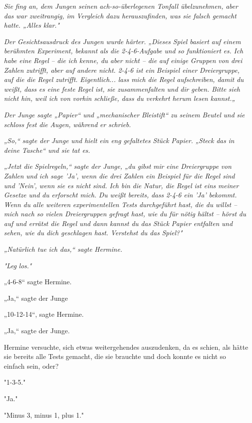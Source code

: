 {\emph{Sie fing an, dem Jungen seinen ach-so-überlegenen Tonfall übelzunehmen, aber das war zweitrangig, im Vergleich dazu herauszufinden, was sie falsch gemacht hatte. „Alles klar."}

\emph{Der Gesichtsausdruck des Jungen wurde härter. „Dieses Spiel basiert auf einem berühmten Experiment, bekannt als die 2-4-6-Aufgabe und so funktioniert es. Ich habe eine} \emph{\emph{Regel}} \emph{-- die ich kenne, du aber nicht -- die auf einige Gruppen von drei Zahlen zutrifft, aber auf andere nicht. 2-4-6 ist ein} \emph{Beispiel einer Dreiergruppe, auf die die Regel zutrifft. Eigentlich... lass mich die Regel aufschreiben, damit du weißt, dass es eine feste Regel ist, sie zusammenfalten und dir geben. Bitte sieh nicht hin, weil ich von vorhin schließe, dass du verkehrt herum lesen kannst.„}

\emph{Der Junge sagte „Papier“ und „mechanischer Bleistift“ zu seinem Beutel und sie schloss fest die Augen, während er schrieb.}

\emph{„So,“ sagte der Junge und hielt ein eng gefaltetes Stück Papier. „Steck das in deine Tasche“ und sie tat es.}

\emph{„Jetzt die Spielregeln,“ sagte der Junge, „du gibst mir eine Dreiergruppe von Zahlen und ich sage 'Ja', wenn die drei Zahlen ein Beispiel für die Regel sind und 'Nein', wenn sie es nicht sind. Ich bin die Natur, die Regel ist eins meiner Gesetze und du erforscht mich. Du weißt bereits, dass 2-4-6 ein 'Ja' bekommt. Wenn du alle weiteren experimentellen Tests durchgeführt hast, die du willst -- mich nach so vielen Dreiergruppen gefragt hast, wie du für nötig hältst -- hörst du auf und errätst die Regel und dann kannst du das Stück Papier entfalten und sehen, wie du dich geschlagen hast. Verstehst du das Spiel?"}

\emph{„Natürlich tue ich das,“ sagte Hermine.}

\emph{"Leg los."}

„4-6-8“ sagte Hermine.

„Ja,“ sagte der Junge

„10-12-14“, sagte Hermine.

„Ja,“ sagte der Junge.

Hermine versuchte, sich etwas weitergehendes auszudenken, da es schien, als hätte sie bereits alle Tests gemacht, die sie brauchte und doch konnte es nicht so einfach sein, oder?

"1-3-5."

"Ja."

"Minus 3, minus 1, plus 1."

}
